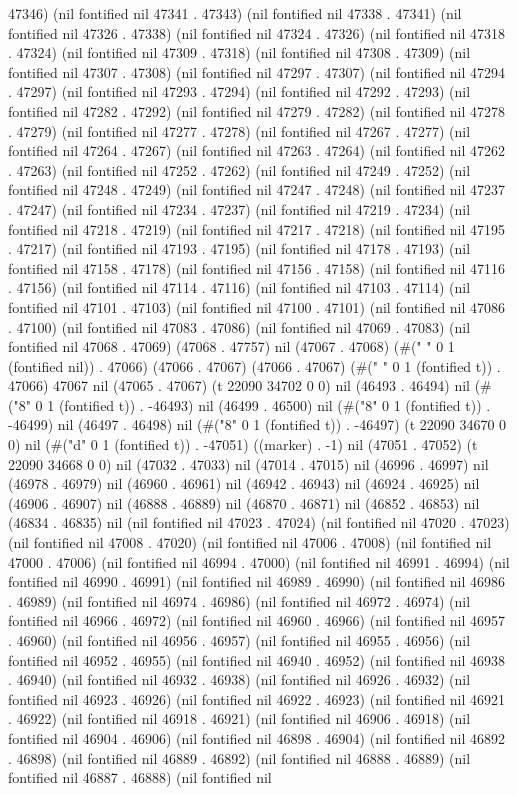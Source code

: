 47346) (nil fontified nil 47341 . 47343) (nil fontified nil 47338 . 47341) (nil fontified nil 47326 . 47338) (nil fontified nil 47324 . 47326) (nil fontified nil 47318 . 47324) (nil fontified nil 47309 . 47318) (nil fontified nil 47308 . 47309) (nil fontified nil 47307 . 47308) (nil fontified nil 47297 . 47307) (nil fontified nil 47294 . 47297) (nil fontified nil 47293 . 47294) (nil fontified nil 47292 . 47293) (nil fontified nil 47282 . 47292) (nil fontified nil 47279 . 47282) (nil fontified nil 47278 . 47279) (nil fontified nil 47277 . 47278) (nil fontified nil 47267 . 47277) (nil fontified nil 47264 . 47267) (nil fontified nil 47263 . 47264) (nil fontified nil 47262 . 47263) (nil fontified nil 47252 . 47262) (nil fontified nil 47249 . 47252) (nil fontified nil 47248 . 47249) (nil fontified nil 47247 . 47248) (nil fontified nil 47237 . 47247) (nil fontified nil 47234 . 47237) (nil fontified nil 47219 . 47234) (nil fontified nil 47218 . 47219) (nil fontified nil 47217 . 47218) (nil fontified nil 47195 . 47217) (nil fontified nil 47193 . 47195) (nil fontified nil 47178 . 47193) (nil fontified nil 47158 . 47178) (nil fontified nil 47156 . 47158) (nil fontified nil 47116 . 47156) (nil fontified nil 47114 . 47116) (nil fontified nil 47103 . 47114) (nil fontified nil 47101 . 47103) (nil fontified nil 47100 . 47101) (nil fontified nil 47086 . 47100) (nil fontified nil 47083 . 47086) (nil fontified nil 47069 . 47083) (nil fontified nil 47068 . 47069) (47068 . 47757) nil (47067 . 47068) (#(" " 0 1 (fontified nil)) . 47066) (47066 . 47067) (47066 . 47067) (#(" " 0 1 (fontified t)) . 47066) 47067 nil (47065 . 47067) (t 22090 34702 0 0) nil (46493 . 46494) nil (#("8" 0 1 (fontified t)) . -46493) nil (46499 . 46500) nil (#("8" 0 1 (fontified t)) . -46499) nil (46497 . 46498) nil (#("8" 0 1 (fontified t)) . -46497) (t 22090 34670 0 0) nil (#("d" 0 1 (fontified t)) . -47051) ((marker) . -1) nil (47051 . 47052) (t 22090 34668 0 0) nil (47032 . 47033) nil (47014 . 47015) nil (46996 . 46997) nil (46978 . 46979) nil (46960 . 46961) nil (46942 . 46943) nil (46924 . 46925) nil (46906 . 46907) nil (46888 . 46889) nil (46870 . 46871) nil (46852 . 46853) nil (46834 . 46835) nil (nil fontified nil 47023 . 47024) (nil fontified nil 47020 . 47023) (nil fontified nil 47008 . 47020) (nil fontified nil 47006 . 47008) (nil fontified nil 47000 . 47006) (nil fontified nil 46994 . 47000) (nil fontified nil 46991 . 46994) (nil fontified nil 46990 . 46991) (nil fontified nil 46989 . 46990) (nil fontified nil 46986 . 46989) (nil fontified nil 46974 . 46986) (nil fontified nil 46972 . 46974) (nil fontified nil 46966 . 46972) (nil fontified nil 46960 . 46966) (nil fontified nil 46957 . 46960) (nil fontified nil 46956 . 46957) (nil fontified nil 46955 . 46956) (nil fontified nil 46952 . 46955) (nil fontified nil 46940 . 46952) (nil fontified nil 46938 . 46940) (nil fontified nil 46932 . 46938) (nil fontified nil 46926 . 46932) (nil fontified nil 46923 . 46926) (nil fontified nil 46922 . 46923) (nil fontified nil 46921 . 46922) (nil fontified nil 46918 . 46921) (nil fontified nil 46906 . 46918) (nil fontified nil 46904 . 46906) (nil fontified nil 46898 . 46904) (nil fontified nil 46892 . 46898) (nil fontified nil 46889 . 46892) (nil fontified nil 46888 . 46889) (nil fontified nil 46887 . 46888) (nil fontified nil 